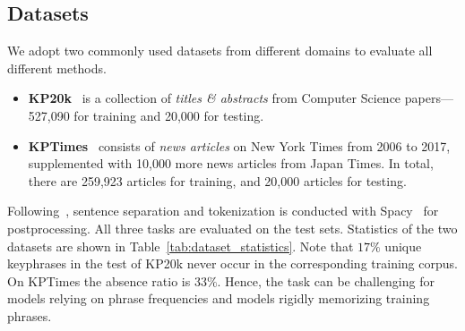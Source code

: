 \documentclass[sigconf]{acmart}
\begin{document}
\subsection{Datasets}
\label{sec:dataset}

We adopt two commonly used datasets from different domains to evaluate all different methods.
\begin{itemize}[nosep,leftmargin=*]
\item \textbf{KP20k}~\cite{meng2017deep} is a collection of 
\emph{titles \& abstracts} from Computer Science papers---527,090 for training and 20,000 for testing.
\item \textbf{KPTimes}~\cite{gallina2019kptimes} consists of \emph{news articles} on New York Times from 2006 to 2017, supplemented with 10,000 more news articles from Japan Times.
In total, there are 259,923 articles for training, and 20,000 articles for testing.
\end{itemize}

\noindent 
Following~\citet{gururangan2020don}, sentence separation and tokenization is conducted with Spacy~\cite{spacy} for postprocessing.
All three tasks are evaluated on the test sets. 
Statistics of the two datasets are shown in Table~\ref{tab:dataset_statistics}.
Note that $17\%$ unique keyphrases in the test of KP20k never occur in the corresponding training corpus.
On KPTimes the absence ratio is $33\%$.
Hence, the task can be challenging for models relying on phrase frequencies and models rigidly memorizing training phrases.
\end{document}
